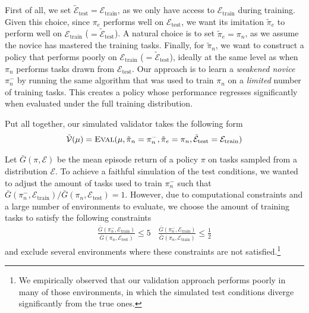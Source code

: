 First of all, we set $\mathcal{ \tilde E}_{\textrm{test}} = \mathcal{E}_{\textrm{train}}$, as we only have access to $\mathcal{E}_{\textrm{train}}$ during training.
Given this choice, since $\pi_e$ performs well on $\mathcal{E}_{\textrm{test}}$, we want its imitation $\tilde \pi_e$ to perform well on $\mathcal{E}_{\textrm{train}}$ ($=\mathcal{ \tilde E}_{\textrm{test}}$).
A natural choice is to set $\tilde \pi_e = \pi_n$, as we assume the novice has mastered the training tasks.
Finally, for $\tilde \pi_n$, we want to construct a policy that performs poorly on $\mathcal{E}_{\textrm{train}}$ ($=\mathcal{ \tilde E}_{\textrm{test}}$), ideally at the same level as when $\pi_n$ performs tasks drawn from $\mathcal{E}_{\textrm{test}}$. 
Our approach is to learn a \textit{weakened novice} $\pi_n^-$ by running the same algorithm that was used to train $\pi_n$ on a \textit{limited} number of training tasks.  
This creates a policy whose performance regresses significantly when evaluated under the full training distribution.

Put all together, our simulated validator takes the following form
\begin{align}
    \mathcal{\tilde V}(\mu) = \textsc{Eval}(\mu, \tilde \pi_{n} = \pi_n^-, \tilde \pi_{e} = \pi_n,\mathcal{ \tilde E}_{\textrm{test}} = \mathcal{E}_{\textrm{train}})
\end{align} 

Let $\bar G(\pi, \mathcal{E})$ be the mean episode return of a policy $\pi$ on tasks sampled from a distribution $\mathcal{E}$.
To achieve a faithful simulation of the test conditions, we wanted to adjust the amount of tasks used to train $\pi^-_n$ such that $\bar G(\pi_n^-, \mathcal{E}_{\textrm{train}})/\bar G(\pi_n, \mathcal{E}_{\textrm{test}}) = 1$.
However, due to computational constraints and a large number of environments to evaluate, we choose the amount of training tasks to satisfy the following constraints 
\begin{align}
\frac{\bar G(\pi_n^-, \mathcal{E}_{\textrm{train}})}{\bar G(\pi_n, \mathcal{E}_{\textrm{test}})} \leq 5 
\ \ \ \  \frac{\bar G(\pi_n^-, \mathcal{E}_{\textrm{train}})}{\bar G(\pi_n, \mathcal{E}_{\textrm{train}})} \leq \frac{1}{2}
\end{align} and exclude several environments where these constraints are not satisfied.\footnote{We empirically observed that our validation approach performs poorly in many of those environments, in which the simulated test 
conditions diverge significantly from the true ones.} 



